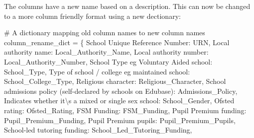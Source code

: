 \documentclass[
  letterpaper,
  DIV=11,
  numbers=noendperiod]{scrartcl}
\newenvironment{Shaded}{\begin{snugshade}}{\end{snugshade}}
\newcommand{\CharTok}[1]{\textcolor[rgb]{0.13,0.47,0.30}{#1}}
\newcommand{\CommentTok}[1]{\textcolor[rgb]{0.37,0.37,0.37}{#1}}
\newcommand{\NormalTok}[1]{\textcolor[rgb]{0.00,0.23,0.31}{#1}}
\newcommand{\OperatorTok}[1]{\textcolor[rgb]{0.37,0.37,0.37}{#1}}
\newcommand{\StringTok}[1]{\textcolor[rgb]{0.13,0.47,0.30}{#1}}
\begin{document}
The columns have a new name based on a description. This can now be
changed to a more column friendly format using a new dectionary:

\begin{Shaded}
\begin{Highlighting}[]
\CommentTok{\# A dictionary mapping old column names to new column names}
\NormalTok{column\_rename\_dict }\OperatorTok{=}\NormalTok{ \{}
    \StringTok{\textquotesingle{}School Unique Reference Number\textquotesingle{}}\NormalTok{: }\StringTok{\textquotesingle{}URN\textquotesingle{}}\NormalTok{,}
    \StringTok{\textquotesingle{}Local authority name\textquotesingle{}}\NormalTok{: }\StringTok{\textquotesingle{}Local\_Authority\_Name\textquotesingle{}}\NormalTok{,}
    \StringTok{\textquotesingle{}Local authority number\textquotesingle{}}\NormalTok{: }\StringTok{\textquotesingle{}Local\_Authority\_Number\textquotesingle{}}\NormalTok{,}
    \StringTok{\textquotesingle{}School Type eg Voluntary Aided school\textquotesingle{}}\NormalTok{: }\StringTok{\textquotesingle{}School\_Type\textquotesingle{}}\NormalTok{,}
    \StringTok{\textquotesingle{}Type of school / college eg maintained school\textquotesingle{}}\NormalTok{: }\StringTok{\textquotesingle{}School\_College\_Type\textquotesingle{}}\NormalTok{,}
    \StringTok{\textquotesingle{}Religious character\textquotesingle{}}\NormalTok{: }\StringTok{\textquotesingle{}Religious\_Character\textquotesingle{}}\NormalTok{,}
    \StringTok{\textquotesingle{}School admissions policy (self{-}declared by schools on Edubase)\textquotesingle{}}\NormalTok{: }\StringTok{\textquotesingle{}Admissions\_Policy\textquotesingle{}}\NormalTok{,}
    \StringTok{\textquotesingle{}Indicates whether it}\CharTok{\textbackslash{}\textquotesingle{}}\StringTok{s a mixed or single sex school\textquotesingle{}}\NormalTok{: }\StringTok{\textquotesingle{}School\_Gender\textquotesingle{}}\NormalTok{,}
    \StringTok{\textquotesingle{}Ofsted rating\textquotesingle{}}\NormalTok{: }\StringTok{\textquotesingle{}Ofsted\_Rating\textquotesingle{}}\NormalTok{,}
    \StringTok{\textquotesingle{}FSM Funding\textquotesingle{}}\NormalTok{: }\StringTok{\textquotesingle{}FSM\_Funding\textquotesingle{}}\NormalTok{,}
    \StringTok{\textquotesingle{}Pupil Premium funding\textquotesingle{}}\NormalTok{: }\StringTok{\textquotesingle{}Pupil\_Premium\_Funding\textquotesingle{}}\NormalTok{,}
    \StringTok{\textquotesingle{}Pupil Premium pupils\textquotesingle{}}\NormalTok{: }\StringTok{\textquotesingle{}Pupil\_Premium\_Pupils\textquotesingle{}}\NormalTok{,}
    \StringTok{\textquotesingle{}School{-}led tutoring funding\textquotesingle{}}\NormalTok{: }\StringTok{\textquotesingle{}School\_Led\_Tutoring\_Funding\textquotesingle{}}\NormalTok{,}

\end{Highlighting}
\end{Shaded}
\end{document}
